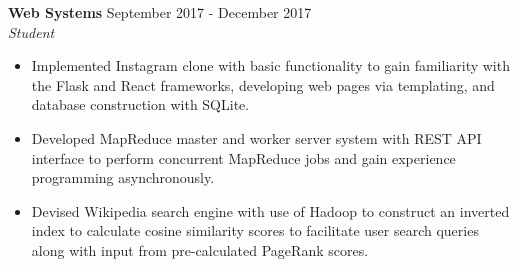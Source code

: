 \documentclass[overlapped]{res}
\begin{document}
\begin{resume}

      \textbf{Web Systems} \hfill September 2017 - December 2017 \\
                  {\sl Student}%
                  \begin{itemize}  \itemsep -2pt %
                    \item Implemented Instagram clone with basic functionality 
                    to gain familiarity with the Flask and React frameworks, 
                    developing web pages via templating, 
                    and database construction with SQLite.
                    \item Developed MapReduce master and worker server system 
                    with REST API interface to perform concurrent MapReduce jobs
                    and gain experience programming asynchronously.
                    \item Devised Wikipedia search engine with use of Hadoop 
                    to construct an inverted index
                    to calculate cosine similarity scores 
                    to facilitate user search queries
                    along with input from pre-calculated PageRank scores.
                  \end{itemize}




\end{resume}
\end{document}
